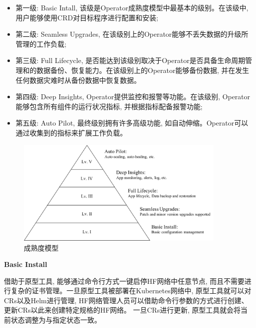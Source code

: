 \begin{itemize}[itemindent=2em]
    \item 第一级: Basic Intall, 该级是Operator成熟度模型中最基本的级别。在该级中, 用户能够使用CRD对目标程序进行配置和安装;

    \item 第二级: Seamless Upgrades, 在该级别上的Operator能够不丢失数据的升级所管理的工作负载;

    \item 第三级: Full Lifecycle, 是否能达到该级别取决于Operator是否具备生命周期管理和的数据备份、恢复能力。在该级别上的Operator能够备份数据, 并在发生任何数据灾难时从备份数据中恢复数据。

    \item 第四级: Deep Insights, Operator提供监控和报警等功能。在该级别, Operator能够包含所有组件的运行状况指标, 并根据指标配备报警功能;

    \item 第五级: Auto Pilot, 最终级别拥有许多高级功能, 如自动伸缩。Operator可以通过收集到的指标来扩展工作负载。

\end{itemize}

\begin{figure}[h] %
    \centering %
    \includegraphics[width=0.9\textwidth]{FIGs/chapter5/maturity.pdf} %
    \caption{成熟度模型} %
    \label{maturity} %
\end{figure}%

\textbf{Basic Install}

借助于原型工具, 能够通过命令行方式一键启停HF网络中任意节点, 而且不需要进行复杂的证书管理。一旦原型工具被部署在Kubernetes网络中, 原型工具就可以对CRs以及Helm进行管理, HF网络管理人员可以借助命令行参数的方式进行创建、更新CRs以此来创建特定规格的HF网络。 一旦CRs进行更新, 原型工具就会将当前状态调整为与指定状态一致。

